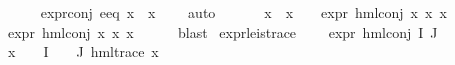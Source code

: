 \begin{isabellebody}
\ \ \ \ \ \ \isamarkupfalse%
\ expr{\isacharunderscore}{\kern0pt}{}{\isacharunderscore}{\kern0pt}conj\ e{}{\isacharunderscore}{\kern0pt}eq\ {\isacartoucheopen}x{}\ {\isacharbackquote}{\kern0pt}\ x{}\ {\isacharequal}{\kern0pt}\ {\isacharbraceleft}{\kern0pt}{\isacharbraceright}{\kern0pt}{\isacartoucheclose}\ \isamarkupfalse%
\ auto\isanewline
\ \ \isamarkupfalse%
\isanewline
\ \ \isamarkupfalse%
\ {\isacartoucheopen}{\isacharparenleft}{\kern0pt}x{}\ {\isacharbackquote}{\kern0pt}\ x{}\ {\isasymnoteq}\ {\isacharbraceleft}{\kern0pt}{\isacharbraceright}{\kern0pt}{\isacharparenright}{\kern0pt}\ {\isasymlongrightarrow}\ {\isacharparenleft}{\kern0pt}expr{\isacharunderscore}{\kern0pt}{}\ {\isacharparenleft}{\kern0pt}hml{\isacharunderscore}{\kern0pt}conj\ x{}\ x{}\ x{}{\isacharparenright}{\kern0pt}\ {\isasymge}\ {}{\isacharparenright}{\kern0pt}{\isacartoucheclose}\ \isanewline
\ \ \isamarkupfalse%
\ {\isachardoublequoteopen}{}\ {\isasymle}\ expr{\isacharunderscore}{\kern0pt}{}\ {\isacharparenleft}{\kern0pt}hml{\isacharunderscore}{\kern0pt}conj\ x{}\ x{}\ x{}{\isacharparenright}{\kern0pt}{\isachardoublequoteclose}\isanewline
\ \ \ \ \isamarkupfalse%
\ blast\isanewline
{}\isamarkupfalse%
%
\endisatagproof
{\isafoldproof}%
%
\isadelimproof
\isanewline
%
\endisadelimproof
\isanewline
{}\isamarkupfalse%
\ expr{\isacharunderscore}{\kern0pt}{}{\isacharunderscore}{\kern0pt}le{\isacharunderscore}{\kern0pt}{}{\isacharunderscore}{\kern0pt}is{\isacharunderscore}{\kern0pt}trace{\isacharcolon}{\kern0pt}\ \isanewline
\ \ \ {\isachardoublequoteopen}expr{\isacharunderscore}{\kern0pt}{}\ {\isacharparenleft}{\kern0pt}hml{\isacharunderscore}{\kern0pt}conj\ I\ J\ {\isasymPhi}{\isacharparenright}{\kern0pt}\ {\isasymle}\ {}{\isachardoublequoteclose}\isanewline
\ \ \ {\isachardoublequoteopen}{\isasymforall}x\ {\isasymin}\ {\isacharparenleft}{\kern0pt}{\isasymPhi}\ {\isacharbackquote}{\kern0pt}\ I\ {\isasymunion}\ {\isasymPhi}\ {\isacharbackquote}{\kern0pt}\ J{\isacharparenright}{\kern0pt}{\isachardot}{\kern0pt}\ {\isacharparenleft}{\kern0pt}hml{\isacharunderscore}{\kern0pt}trace\ x{\isacharparenright}{\kern0pt}{\isachardoublequoteclose}\isanewline
%
\isadelimproof
%
\endisadelimproof
%
\isatagproof

\end{isabellebody}
